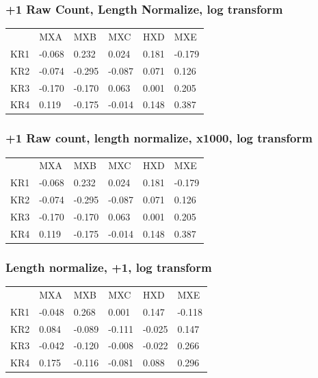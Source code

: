 \subsubsection{+1 Raw Count, Length Normalize, log transform}

\begin{table}[h!]
\begin{tabular}{llllll}
&MXA & MXB                  & MXC                  & HXD                  & MXE                                         \\
KR1 & -0.068 & 0.232    & 0.024  & 0.181   & -0.179 \\
KR2 & -0.074 & -0.295 & -0.087 & 0.071  & 0.126  \\
KR3 & -0.170 & -0.170 & 0.063   & 0.001 & 0.205  \\
KR4 & 0.119  & -0.175  & -0.014 & 0.148   & 0.387
\end{tabular}
\end{table}

\subsubsection{+1 Raw count, length normalize, x1000, log transform}

\begin{table}[h!]
\begin{tabular}{llllll}
&MXA & MXB                  & MXC                 & HXD                   & MXE                                         \\
KR1 & -0.068 & 0.232 & 0.024   & 0.181   & -0.179 \\
KR2 & -0.074 & -0.295 & -0.087  & 0.071    & 0.126  \\
KR3 & -0.170  & -0.170 & 0.063    & 0.001 & 0.205  \\
KR4 & 0.119  & -0.175 & -0.014 & 0.148   & 0.387 
\end{tabular}
\end{table}

\subsubsection{Length normalize, +1, log transform}

\begin{table}[h!]
\begin{tabular}{llllll}
&MXA & MXB                   & MXC                  & HXD                   & MXE                                         \\
KR1 & -0.048  & 0.268    & 0.001 & 0.147    & -0.118 \\
KR2 & 0.084   & -0.089 & -0.111  & -0.025  & 0.147  \\
KR3 & -0.042 & -0.120 & -0.008 & -0.022 & 0.266   \\
KR4 & 0.175   & -0.116 & -0.081  & 0.088    & 0.296
\end{tabular}
\end{table}

